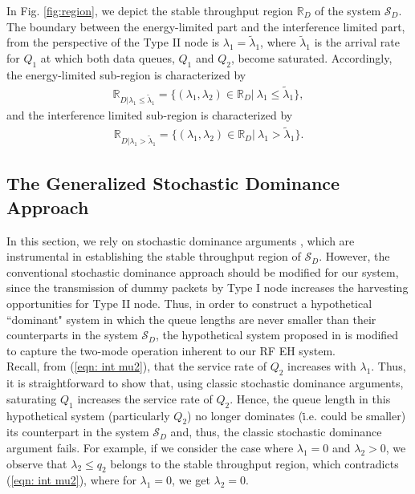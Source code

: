 \documentclass[draftcls,12pt,onecolumn]{IEEEtran}
\begin{document}
In Fig. \ref{fig:region}, we depict the stable throughput region $\mathbb{R}_D$ of the system $\mathcal{S}_D$. The boundary between the energy-limited part and the interference limited part, from the perspective of the Type II node is $\lambda_1 = \tilde{\lambda}_1$, where $\tilde{\lambda}_1$ is the arrival rate for $Q_1$ at which both data queues, $ Q_1$ and $Q_2$, become saturated. Accordingly, the energy-limited sub-region is characterized by 
\begin{align}
\mathbb{R}_{D |  \lambda_1 \leq \tilde{\lambda}_1 }=\big\{ (\lambda_1,\lambda_2) \in \mathbb{R}_D | \ \lambda_1 \leq \tilde{\lambda}_1 \big\},
\end{align}
and the interference limited sub-region is characterized by  
\begin{align}
\mathbb{R}_{D |  \lambda_1 > \tilde{\lambda}_1 }=\big\{ (\lambda_1,\lambda_2) \in \mathbb{R}_D | \ \lambda_1 > \tilde{\lambda}_1 \big\}. 
\end{align}



\subsection{The Generalized Stochastic Dominance Approach}
In this section, we rely on stochastic dominance arguments \cite{rao1988stability}, which are instrumental in establishing the stable throughput region of $\mathcal{S}_D$. However, the conventional stochastic dominance approach should be modified for our system, since the transmission of dummy packets by Type I node increases the harvesting opportunities for Type II node. Thus, in order to construct a hypothetical ``dominant" system in which the queue lengths are never smaller than their counterparts in the system $\mathcal{S}_D$, the hypothetical system proposed in \cite{rao1988stability} is modified to capture the two-mode operation inherent to our RF EH system.\\ 
Recall, from (\ref{eqn: int mu2}), that the service rate of $Q_2$ increases with $\lambda_1$. Thus, it is straightforward to show that, using classic stochastic dominance arguments, saturating $Q_1$ increases the service rate of $Q_2$. Hence, the queue length in this hypothetical system (particularly $Q_2$) no longer dominates (\.i.e. could be smaller) its counterpart in the system $\mathcal{S}_D$ and, thus, the classic stochastic dominance argument fails. For example, if we consider the case where $\lambda_1 = 0$ and $\lambda_2 >0$, we observe that $\lambda_2 \leq q_2 $ belongs to the stable throughput region, which contradicts (\ref{eqn: int mu2}), where for $\lambda_1=0$, we get $\lambda_2=0$.
\end{document}
